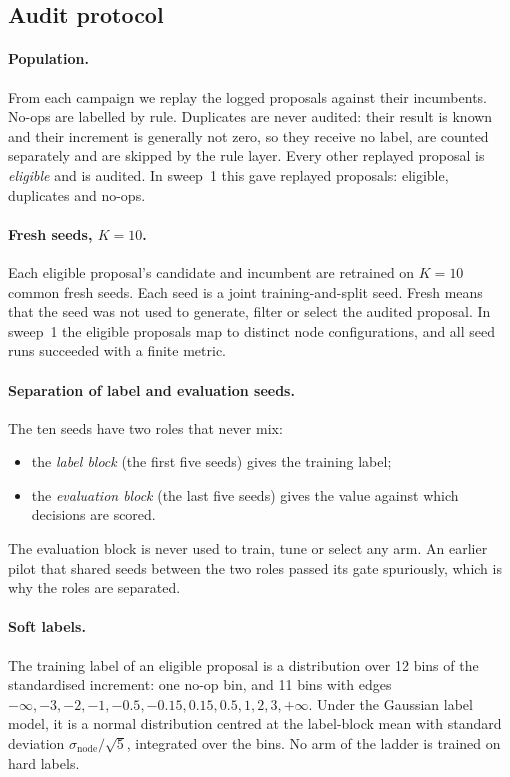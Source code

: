 \subsection{Audit protocol}

\paragraph{Population.}
From each campaign we replay the logged proposals against their incumbents. No-ops are labelled by rule. Duplicates are never audited: their result is known and their increment is generally not zero, so they receive no label, are counted separately and are skipped by the rule layer. Every other replayed proposal is \emph{eligible} and is audited. In sweep~1 this gave \SweepOneProposals{} replayed proposals: \SweepOneEligible{} eligible, \SweepOneDuplicates{} duplicates and \SweepOneNoops{} no-ops. \SweepTwoAuditCounts

\paragraph{Fresh seeds, $K=10$.}
Each eligible proposal's candidate and incumbent are retrained on $K=10$ common fresh seeds. Each seed is a joint training-and-split seed. Fresh means that the seed was not used to generate, filter or select the audited proposal. In sweep~1 the eligible proposals map to \SweepOneConfigs{} distinct node configurations, and all \SweepOneSeedRuns{} seed runs succeeded with a finite metric.

\paragraph{Separation of label and evaluation seeds.}
The ten seeds have two roles that never mix:
\begin{itemize}
\item the \emph{label block} (the first five seeds) gives the training label;
\item the \emph{evaluation block} (the last five seeds) gives the value against which decisions are scored.
\end{itemize}
The evaluation block is never used to train, tune or select any arm. An earlier pilot that shared seeds between the two roles passed its gate spuriously, which is why the roles are separated.

\paragraph{Soft labels.}
The training label of an eligible proposal is a distribution over 12 bins of the standardised increment: one no-op bin, and 11 bins with edges $-\infty,-3,-2,-1,-0.5,-0.15,0.15,0.5,1,2,3,+\infty$. Under the Gaussian label model, it is a normal distribution centred at the label-block mean with standard deviation $\sigma_{\mathrm{node}}/\sqrt{5}$, integrated over the bins. No arm of the ladder is trained on hard labels.

